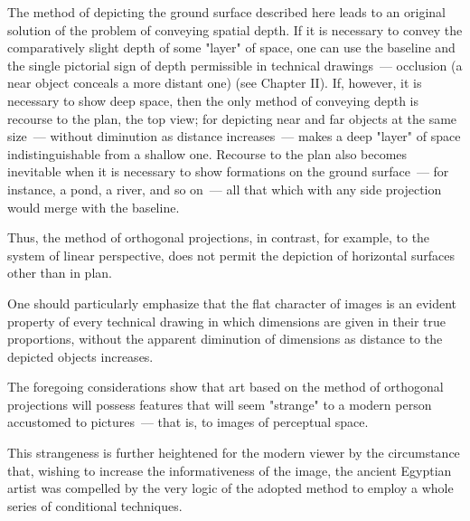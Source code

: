 
The method of depicting the ground surface described here leads to an original solution
of the problem of conveying spatial depth. If it is necessary to convey the comparatively
slight depth of some "layer" of space, one can use the baseline and the single pictorial
sign of depth permissible in technical drawings~--- occlusion (a near object conceals a
more distant one) (see Chapter II). If, however, it is necessary to show deep space, then
the only method of conveying depth is recourse to the plan, the top view; for depicting
near and far objects at the same size~--- without diminution as distance increases~--- makes
a deep "layer" of space indistinguishable from a shallow one. Recourse to the plan also
becomes inevitable when it is necessary to show formations on the ground surface~---
for instance, a pond, a river, and so on~--- all that which with any side projection would
merge with the baseline.

Thus, the method of orthogonal projections, in contrast, for example, to the system of
linear perspective, does not permit the depiction of horizontal surfaces other than in plan.



One should particularly emphasize that the flat character of images is an evident
property of every technical drawing in which dimensions are given in their true
proportions, without the apparent diminution of dimensions as distance to the depicted
objects increases.

The foregoing considerations show that art based on the method of orthogonal
projections will possess features that will seem "strange" to a modern person accustomed
to pictures~--- that is, to images of perceptual space.

This strangeness is further heightened for the modern viewer by the circumstance that,
wishing to increase the informativeness of the image, the ancient Egyptian artist was
compelled by the very logic of the adopted method to employ a whole series of
conditional techniques.

\medskip

